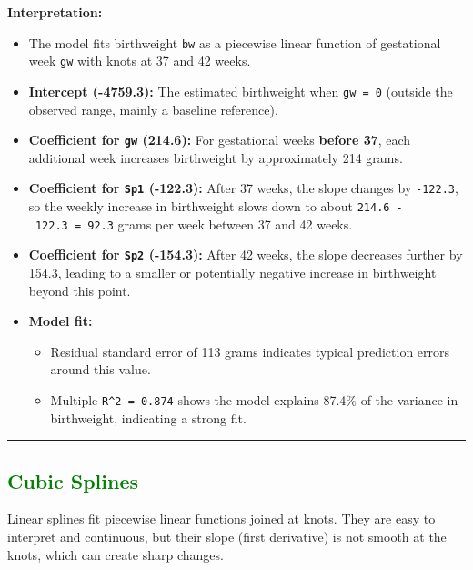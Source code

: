 \documentclass[
  letterpaper,
  DIV=11,
  numbers=noendperiod]{scrreprt}
\providecommand{\tightlist}{%
  \setlength{\itemsep}{0pt}\setlength{\parskip}{0pt}}\usepackage{longtable,booktabs,array}
\begin{document}
\textbf{Interpretation:}

\begin{itemize}
\item
  The model fits birthweight \texttt{bw} as a piecewise linear function
  of gestational week \texttt{gw} with knots at 37 and 42 weeks.
\item
  \textbf{Intercept (-4759.3):} The estimated birthweight when
  \texttt{gw\ =\ 0} (outside the observed range, mainly a baseline
  reference).
\item
  \textbf{Coefficient for \texttt{gw} (214.6):} For gestational weeks
  \textbf{before 37}, each additional week increases birthweight by
  approximately 214 grams.
\item
  \textbf{Coefficient for \texttt{Sp1} (-122.3):} After 37 weeks, the
  slope changes by \texttt{-122.3}, so the weekly increase in
  birthweight slows down to about \texttt{214.6\ -\ 122.3\ =\ 92.3}
  grams per week between 37 and 42 weeks.
\item
  \textbf{Coefficient for \texttt{Sp2} (-154.3):} After 42 weeks, the
  slope decreases further by 154.3, leading to a smaller or potentially
  negative increase in birthweight beyond this point.
\item
  \textbf{Model fit:}

  \begin{itemize}
  \tightlist
  \item
    Residual standard error of 113 grams indicates typical prediction
    errors around this value.\\
  \item
    Multiple \texttt{R\^{}2\ =\ 0.874} shows the model explains 87.4\%
    of the variance in birthweight, indicating a strong fit.
  \end{itemize}
\end{itemize}

\begin{center}\rule{0.5\linewidth}{0.5pt}\end{center}

\hypertarget{section-24}{%
\subsection*{\texorpdfstring{\textcolor{green}{Cubic Splines}}{}}\label{section-24}}

Linear splines fit piecewise linear functions joined at knots. They are
easy to interpret and continuous, but their slope (first derivative) is
not smooth at the knots, which can create sharp changes.
\end{document}
